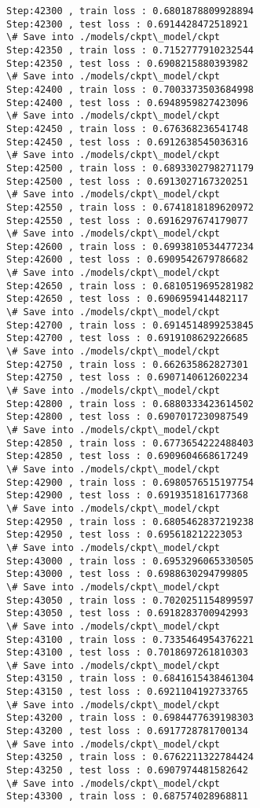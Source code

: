 \documentclass[11pt]{article}
\begin{document}
\begin{Verbatim}[commandchars=\\\{\}]
Step:42300 , train loss : 0.6801878809928894
Step:42300 , test loss : 0.6914428472518921
\# Save into ./models/ckpt\_model/ckpt
Step:42350 , train loss : 0.7152777910232544
Step:42350 , test loss : 0.6908215880393982
\# Save into ./models/ckpt\_model/ckpt
Step:42400 , train loss : 0.7003373503684998
Step:42400 , test loss : 0.6948959827423096
\# Save into ./models/ckpt\_model/ckpt
Step:42450 , train loss : 0.676368236541748
Step:42450 , test loss : 0.6912638545036316
\# Save into ./models/ckpt\_model/ckpt
Step:42500 , train loss : 0.6893302798271179
Step:42500 , test loss : 0.6913027167320251
\# Save into ./models/ckpt\_model/ckpt
Step:42550 , train loss : 0.6741818189620972
Step:42550 , test loss : 0.6916297674179077
\# Save into ./models/ckpt\_model/ckpt
Step:42600 , train loss : 0.6993810534477234
Step:42600 , test loss : 0.6909542679786682
\# Save into ./models/ckpt\_model/ckpt
Step:42650 , train loss : 0.6810519695281982
Step:42650 , test loss : 0.6906959414482117
\# Save into ./models/ckpt\_model/ckpt
Step:42700 , train loss : 0.6914514899253845
Step:42700 , test loss : 0.6919108629226685
\# Save into ./models/ckpt\_model/ckpt
Step:42750 , train loss : 0.662635862827301
Step:42750 , test loss : 0.6907140612602234
\# Save into ./models/ckpt\_model/ckpt
Step:42800 , train loss : 0.6880333423614502
Step:42800 , test loss : 0.6907017230987549
\# Save into ./models/ckpt\_model/ckpt
Step:42850 , train loss : 0.6773654222488403
Step:42850 , test loss : 0.6909604668617249
\# Save into ./models/ckpt\_model/ckpt
Step:42900 , train loss : 0.6980576515197754
Step:42900 , test loss : 0.6919351816177368
\# Save into ./models/ckpt\_model/ckpt
Step:42950 , train loss : 0.6805462837219238
Step:42950 , test loss : 0.695618212223053
\# Save into ./models/ckpt\_model/ckpt
Step:43000 , train loss : 0.6953296065330505
Step:43000 , test loss : 0.6988630294799805
\# Save into ./models/ckpt\_model/ckpt
Step:43050 , train loss : 0.7020251154899597
Step:43050 , test loss : 0.6918283700942993
\# Save into ./models/ckpt\_model/ckpt
Step:43100 , train loss : 0.7335464954376221
Step:43100 , test loss : 0.7018697261810303
\# Save into ./models/ckpt\_model/ckpt
Step:43150 , train loss : 0.6841615438461304
Step:43150 , test loss : 0.6921104192733765
\# Save into ./models/ckpt\_model/ckpt
Step:43200 , train loss : 0.6984477639198303
Step:43200 , test loss : 0.6917728781700134
\# Save into ./models/ckpt\_model/ckpt
Step:43250 , train loss : 0.6762211322784424
Step:43250 , test loss : 0.6907974481582642
\# Save into ./models/ckpt\_model/ckpt
Step:43300 , train loss : 0.687574028968811

\end{Verbatim}
\end{document}
